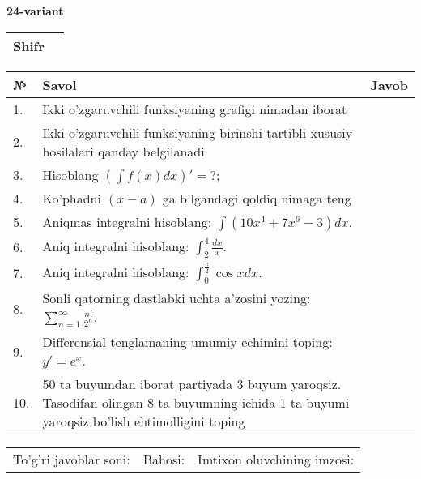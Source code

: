 \documentclass{article}
\begin{document}
  \egroup
  
  \newpage
  
  
  \textbf{24-variant}\\
  
  \bgroup
  \def\arraystretch{1.6} %
  
  \begin{tabular}{|m{5.7cm}|m{9.5cm}|}
  \hline
  Shifr & \\
  \hline
  \end{tabular}
  
  \vspace{1cm}
  
  \begin{tabular}{|m{0.7cm}|m{10cm}|m{4cm}|}
  \hline
  № & Savol & Javob \\
  \hline
  1. & Ikki o'zgaruvchili funksiyaning grafigi nimadan iborat &  \\
  \hline
  2. & Ikki o'zgaruvchili funksiyaning birinshi tartibli xususiy hosilalari qanday belgilanadi &  \\
  \hline
  3. & Hisoblang \(\left( \int {f(x)dx} \right)' = ?\); &  \\
  \hline
  4. & Ko'phadni \((x - a)\) ga b'lgandagi qoldiq nimaga teng &  \\
  \hline
  5. & Aniqmas integralni hisoblang: \(\int {\left( 10x^{4} + 7x^{6} - 3 \right)dx}\). &  \\
  \hline
  6. & Aniq integralni hisoblang: \(\int_{2}^{4}\frac{dx}{x}\). &  \\
  \hline
  7. & Aniq integralni hisoblang: \(\int_{0}^{\frac{\pi}{2}}{\cos xdx}\). &  \\
  \hline
  8. & Sonli qatorning dastlabki uchta a'zosini yozing: \(\sum_{n = 1}^{\infty}\frac{n!}{2^{n}}\). &  \\
  \hline
  9. & Differensial tenglamaning umumiy echimini toping: \(y' = e^{x}\). &  \\
  \hline
  10. & 50 ta buyumdan iborat partiyada 3 buyum yaroqsiz. Tasodifan olingan 8 ta buyumning ichida 1 ta buyumi yaroqsiz bo'lish ehtimolligini toping &  \\
  \hline
  \end{tabular}
  
  \vspace{1cm}
  
  \begin{tabular}{lll}
  To'g'ri javoblar soni: \underline{\hspace{1.5cm}} & 
  Bahosi: \underline{\hspace{1.5cm}} & 
  Imtixon oluvchining imzosi: \underline{\hspace{2cm}} \\
  \end{tabular}
  
\end{document}

